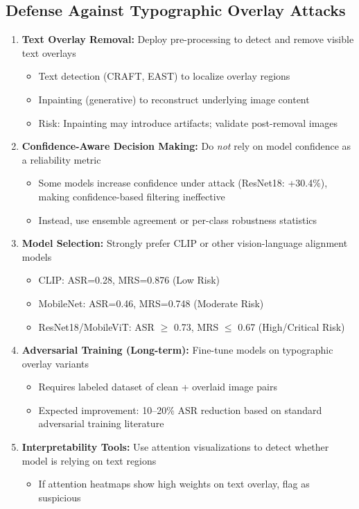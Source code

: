 \documentclass[11pt]{article}
\begin{document}
\subsection{Defense Against Typographic Overlay Attacks}

\begin{enumerate}[leftmargin=2em]
    \item \textbf{Text Overlay Removal:} Deploy pre-processing to detect and remove visible text overlays
    \begin{itemize}[leftmargin=1.5em]
        \item Text detection (CRAFT, EAST) to localize overlay regions
        \item Inpainting (generative) to reconstruct underlying image content
        \item Risk: Inpainting may introduce artifacts; validate post-removal images
    \end{itemize}
    
    \item \textbf{Confidence-Aware Decision Making:} Do \textit{not} rely on model confidence as a reliability metric
    \begin{itemize}[leftmargin=1.5em]
        \item Some models increase confidence under attack (ResNet18: +30.4\%), making confidence-based filtering ineffective
        \item Instead, use ensemble agreement or per-class robustness statistics
    \end{itemize}
    
    \item \textbf{Model Selection:} Strongly prefer CLIP or other vision-language alignment models
    \begin{itemize}[leftmargin=1.5em]
        \item CLIP: ASR=0.28, MRS=0.876 (Low Risk)
        \item MobileNet: ASR=0.46, MRS=0.748 (Moderate Risk)
        \item ResNet18/MobileViT: ASR $\geq$ 0.73, MRS $\leq$ 0.67 (High/Critical Risk)
    \end{itemize}
    
    \item \textbf{Adversarial Training (Long-term):} Fine-tune models on typographic overlay variants
    \begin{itemize}[leftmargin=1.5em]
        \item Requires labeled dataset of clean + overlaid image pairs
        \item Expected improvement: 10--20\% ASR reduction based on standard adversarial training literature
    \end{itemize}
    
    \item \textbf{Interpretability Tools:} Use attention visualizations to detect whether model is relying on text regions
    \begin{itemize}[leftmargin=1.5em]
        \item If attention heatmaps show high weights on text overlay, flag as suspicious
    \end{itemize}
\end{enumerate}
\end{document}
